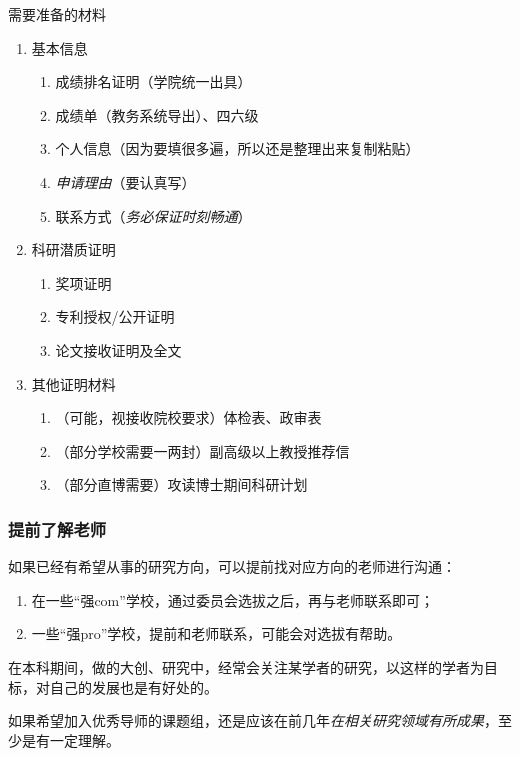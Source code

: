 \begin{frame}{需要准备的材料}
	\begin{enumerate}
		\item 基本信息
		      \begin{enumerate}
			      \item 成绩排名证明（学院统一出具）
			      \item 成绩单（教务系统导出）、四六级
			      \item 个人信息（因为要填很多遍，所以还是整理出来复制粘贴）
			      \item \emph{申请理由}（要认真写）
			      \item 联系方式（\emph{务必保证时刻畅通}）
		      \end{enumerate}
		\item 科研潜质证明
		      \begin{enumerate}
			      \item 奖项证明
			      \item 专利授权/公开证明
			      \item 论文接收证明及全文
		      \end{enumerate}
		\item 其他证明材料
		      \begin{enumerate}
			      \item （可能，视接收院校要求）体检表、政审表
			      \item （部分学校需要一两封）副高级以上教授推荐信
			      \item （部分直博需要）攻读博士期间科研计划
		      \end{enumerate}
	\end{enumerate}
\end{frame}


\begin{frame}
	\frametitle{提前了解老师}

	如果已经有希望从事的研究方向，可以提前找对应方向的老师进行沟通：

	\begin{enumerate}
		\item 在一些“强com”学校，通过委员会选拔之后，再与老师联系即可；
		\item 一些“强pro”学校，提前和老师联系，可能会对选拔有帮助。
	\end{enumerate}

	在本科期间，做的大创、研究中，经常会关注某学者的研究，以这样的学者为目标，对自己的发展也是有好处的。

	如果希望加入优秀导师的课题组，还是应该在前几年\emph{在相关研究领域有所成果}，至少是有一定理解。

\end{frame}

